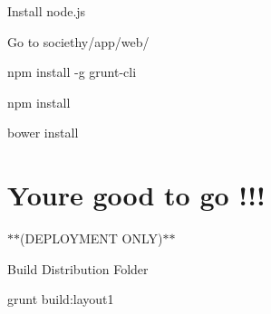 
\begin{DoxyItemize}
\item Install node.\+js
\item Go to societhy/app/web/
\end{DoxyItemize}

{\ttfamily npm install -\/g grunt-\/cli}

{\ttfamily npm install}

{\ttfamily bower install}

\section*{You\textquotesingle{}re good to go !!!}

$\ast$$\ast$(D\+E\+P\+L\+O\+Y\+M\+E\+NT O\+N\+LY)$\ast$$\ast$


\begin{DoxyItemize}
\item Build Distribution Folder
\end{DoxyItemize}

{\ttfamily grunt build\+:layout1} 